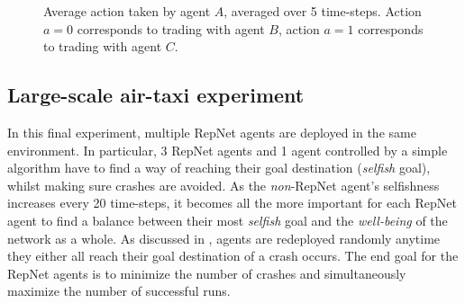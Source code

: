\begin{figure}[h]
\centering
{}
\caption{Average action taken by agent $A$, averaged over 5 time-steps. Action $a = 0$ corresponds to trading with agent $B$, action $a = 1$ corresponds to trading with agent $C$.}
\label{subfig:actiontaken}
\end{figure}

\subsection{Large-scale air-taxi experiment}
\label{sub:largetaxi}
In this final experiment, multiple RepNet agents are deployed in the same environment. In particular, 3 RepNet agents and 1 agent controlled by a simple algorithm have to find a way of reaching their goal destination (\textit{selfish} goal), whilst making sure crashes are avoided. As the \textit{non}-RepNet agent's selfishness increases every 20 time-steps, it becomes all the more important for each RepNet agent to find a balance between their most \textit{selfish} goal and the \textit{well-being} of the network as a whole. As discussed in , agents are redeployed randomly anytime they either all reach their goal destination of a crash occurs. The end goal for the RepNet agents is to minimize the number of crashes and simultaneously maximize the number of successful runs. 

